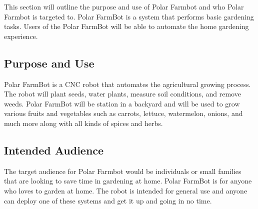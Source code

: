 This section will outline the purpose and use of Polar Farmbot and who Polar Farmbot is targeted to. Polar FarmBot is a system that performs basic gardening tasks. Users of the Polar FarmBot will be able to automate the home gardening experience.

\subsection{Purpose and Use}
Polar FarmBot is a CNC robot that automates the agricultural growing process. The robot will plant seeds, water plants, measure soil conditions, and remove weeds. Polar FarmBot will be station in a backyard and will be used to grow various fruits and vegetables such as carrots, lettuce, watermelon, onions, and much more along with all kinds of spices and herbs.

\subsection{Intended Audience}
The target audience for Polar Farmbot would be individuals or small families that are looking to save time in gardening at home. Polar FarmBot is for anyone who loves to garden at home. The robot is intended for general use and anyone can deploy one of these systems and get it up and going in no time.
